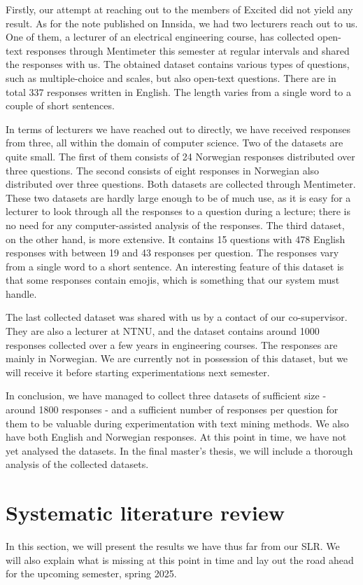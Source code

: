 Firstly, our attempt at reaching out to the members of Excited did not yield any result. As for the note published on Innsida, we had two lecturers reach out to us. One of them, a lecturer of an electrical engineering course, has collected open-text responses through Mentimeter this semester at regular intervals and shared the responses with us. The obtained dataset contains various types of questions, such as multiple-choice and scales, but also open-text questions. There are in total 337 responses written in English. The length varies from a single word to a couple of short sentences.

In terms of lecturers we have reached out to directly, we have received responses from three, all within the domain of computer science. Two of the datasets are quite small. The first of them consists of 24 Norwegian responses distributed over three questions. The second consists of eight responses in Norwegian also distributed over three questions. Both datasets are collected through Mentimeter. These two datasets are hardly large enough to be of much use, as it is easy for a lecturer to look through all the responses to a question during a lecture; there is no need for any computer-assisted analysis of the responses. The third dataset, on the other hand, is more extensive. It contains 15 questions with 478 English responses with between 19 and 43 responses per question. The responses vary from a single word to a short sentence. An interesting feature of this dataset is that some responses contain emojis, which is something that our system must handle.

The last collected dataset was shared with us by a contact of our co-supervisor. They are also a lecturer at NTNU, and the dataset contains around 1000 responses collected over a few years in engineering courses. The responses are mainly in Norwegian. We are currently not in possession of this dataset, but we will receive it before starting experimentations next semester.

In conclusion, we have managed to collect three datasets of sufficient size - around 1800 responses - and a sufficient number of responses per question for them to be valuable during experimentation with text mining methods. We also have both English and Norwegian responses. At this point in time, we have not yet analysed the datasets. In the final master's thesis, we will include a thorough analysis of the collected datasets.

\section{Systematic literature review}\label{sec:results-slr}
In this section, we will present the results we have thus far from our SLR. We will also explain what is missing at this point in time and lay out the road ahead for the upcoming semester, spring 2025.

